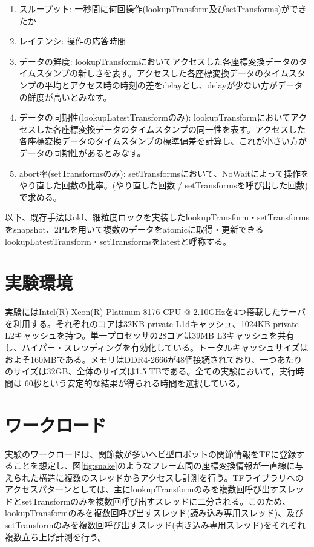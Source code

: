\documentclass[a4paper]{jreport}	%
\begin{document}
\begin{enumerate}
	\item スループット: 一秒間に何回操作(lookupTransform及びsetTransforms)ができたか
	\item レイテンシ: 操作の応答時間
	\item データの鮮度: lookupTransformにおいてアクセスした各座標変換データのタイムスタンプの新しさを表す。アクセスした各座標変換データのタイムスタンプの平均とアクセス時の時刻の差をdelayとし、delayが少ない方がデータの鮮度が高いとみなす。
	\item データの同期性(lookupLatestTransformのみ): lookupTransformにおいてアクセスした各座標変換データのタイムスタンプの同一性を表す。アクセスした各座標変換データのタイムスタンプの標準偏差を計算し、これが小さい方がデータの同期性があるとみなす。
	\item abort率(setTransformsのみ): setTransformsにおいて、NoWaitによって操作をやり直した回数の比率。(やり直した回数 / setTransformsを呼び出した回数) で求める。
\end{enumerate}

以下、既存手法はold、細粒度ロックを実装したlookupTransform・setTransformsをsnapshot、2PLを用いて複数のデータをatomicに取得・更新できるlookupLatestTransform・setTransformsをlatestと呼称する。



\section{実験環境}

実験にはIntel(R) Xeon(R) Platinum 8176 CPU @ 2.10GHzを4つ搭載したサーバを利用する。それぞれのコアは32KB private L1dキャッシュ、1024KB private L2キャッシュを持つ。単一プロセッサの28コアは39MB L3キャッシュを共有し、ハイパー・スレッディングを有効化している。トータルキャッシュサイズはおよそ160MBである。メモリはDDR4-2666が48個接続されており、一つあたりのサイズは32GB、全体のサイズは1.5 TBである。全ての実験において，実行時間は 60秒という安定的な結果が得られる時間を選択している。

\section{ワークロード}

実験のワークロードは、関節数が多いヘビ型ロボットの関節情報をTFに登録することを想定し、図\ref{fig:snake}のようなフレーム間の座標変換情報が一直線に与えられた構造に複数のスレッドからアクセスし計測を行う。TFライブラリへのアクセスパターンとしては、主にlookupTransformのみを複数回呼び出すスレッドとsetTransformのみを複数回呼び出すスレッドに二分される。このため、lookupTransformのみを複数回呼び出すスレッド(読み込み専用スレッド)、及びsetTransformのみを複数回呼び出すスレッド(書き込み専用スレッド)をそれぞれ複数立ち上げ計測を行う。
\end{document}
